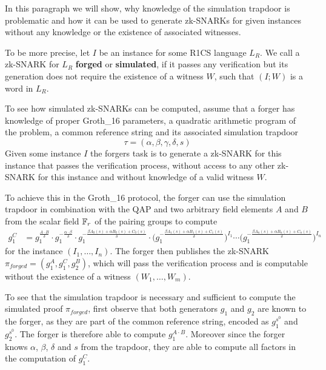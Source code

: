 In this paragraph we will show, why knowledge of the simulation trapdoor is problematic and how it can be used to generate zk-SNARKs for given instances without any knowledge or the existence of associated witnesses. 

To be more precise, let $I$ be an instance for some R1CS language $L_R$. We call a zk-SNARK for $L_R$ \textbf{forged} or \textbf{simulated}, if it passes any verification but its generation does not require the existence of a witness $W$, such that $(I;W)$ is a word in $L_R$. 

To see how simulated zk-SNARKs can be computed, assume that a forger has knowledge of proper Groth\_16 parameters, a quadratic arithmetic program of the problem, a common reference string and its associated simulation trapdoor
\begin{equation}
\tau = (\alpha,\beta,\gamma,\delta,s)
\end{equation}
Given some instance $I$ the forgers task is to generate a zk-SNARK for this instance that passes the verification process, without access to any other zk-SNARK for this instance and without knowledge of a valid witness $W$.

To achieve this in the Groth\_16 protocol, the forger can use the simulation trapdoor in combination with the QAP and two arbitrary field elements $A$ and $B$ from the scalar field $\mathbb{F}_r$ of the pairing groups to compute 
\begin{align*}
g_1^C & = g_1^{\frac{A\cdot B}{\delta}}\cdot g_1^{-\frac{\alpha\cdot \beta}{\delta}}\cdot g_1^{-\frac{\beta A_0(s) + \alpha B_0(s)+ C_0(s)}{\delta}}\cdot \Big(g_1^{-\frac{\beta A_1(s) + \alpha B_1(s)+ C_1(s)}{\delta}}\Big)^{I_1}\cdots \Big(g_1^{-\frac{\beta A_n(s) + \alpha B_n(s)+ C_n(s)}{\delta}}\Big)^{I_n}\
\end{align*} 
for the instance $(I_1,\ldots,I_n)$. The forger then publishes the zk-SNARK $\pi_{forged} = (g_1^A, g_1^C, g_2^B)$, which will pass the verification process and is computable without the existence of a witness $(W_1,\ldots,W_m)$.

To see that the simulation trapdoor is necessary and sufficient to compute the simulated proof $\pi_{forged}$, first observe that both generators $g_1$ and $g_2$ are known to the forger, as they are part of the common reference string, encoded as $g_1^{s^0}$ and $g_2^{s^0}$. The forger is therefore able to compute $g_1^{A\cdot B}$. Moreover since the forger knows $\alpha$, $\beta$, $\delta$ and $s$ from the trapdoor, they are able to compute all factors in the computation of $g_1^C$.

